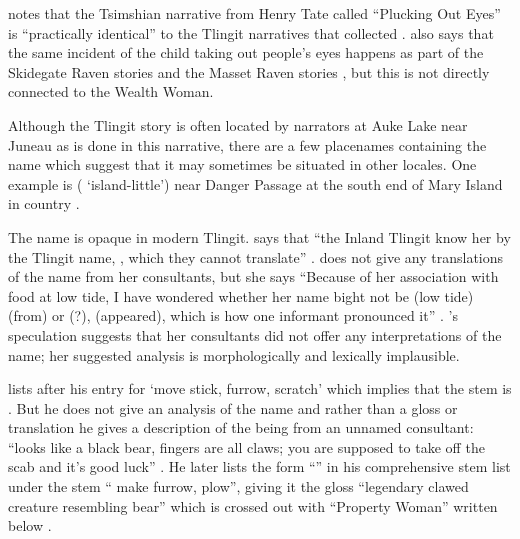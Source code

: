 \citeauthor{boas:1916} notes that the Tsimshian narrative from Henry Tate called “Plucking Out Eyes” \parencite[154–158]{boas:1916} is “practically identical” to the Tlingit narratives that \citeauthor{swanton:1909} collected \parencite[746]{boas:1916}.
\citeauthor{boas:1916} also says that the same incident of the child taking out people’s eyes happens as part of the Skidegate Raven stories \parencite[111]{swanton:1905b} and the Masset Raven stories \parencite[143]{swanton:1905b}, but this is not directly connected to the Wealth Woman.

Although the Tlingit story is often located by narrators at  Auke Lake near Juneau as is done in this narrative, there are a few placenames containing the name  which suggest that it may sometimes be situated in other locales.
One example is  ( ‘island-little’) near Danger Passage at the south end of Mary Island in  country \parencite[202 \#675]{thornton:2012}.


The name  is opaque in modern Tlingit.
\citeauthor{mcclellan:1975b} says that “the Inland Tlingit know her by the Tlingit name, , which they cannot translate” \parencite[572]{mcclellan:1975b}.
\citeauthor{de-laguna:1972} does not give any translations of the name from her consultants, but she says “Because of her association with food at low tide, I have wondered whether her name bight not be  (low tide)  (from)  or  (?),  (appeared), which is how one informant pronounced it” \parencite[821]{de-laguna:1972}.
\citeauthor{de-laguna:1972}’s speculation suggests that her consultants did not offer any interpretations of the name; her suggested analysis is morphologically and lexically implausible.

\citeauthor{leer:1973} lists  after his entry for  ‘move stick, furrow, scratch’ which implies that the stem is  \parencite[f03/70]{leer:1973}.
But he does not give an analysis of the name and rather than a gloss or translation he gives a description of the being from an unnamed consultant: “looks like a black bear, fingers are all claws; you are supposed to take off the scab and it’s good luck” \parencite[f03/70]{leer:1973}.
He later lists the form “” in his comprehensive stem list under the stem “ make furrow, plow”, giving it the gloss “legendary clawed creature resembling bear” which is crossed out with “Property Woman” written below \parencite[53]{leer:1978b}.


